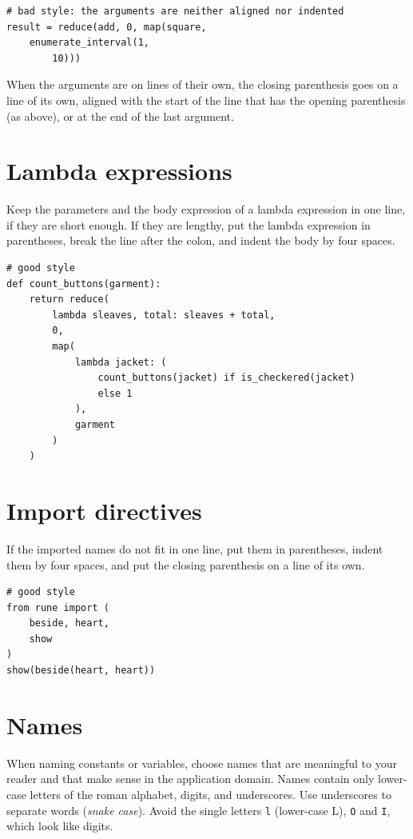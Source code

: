 \begin{lstlisting}
# bad style: the arguments are neither aligned nor indented
result = reduce(add, 0, map(square,
    enumerate_interval(1,
        10)))
\end{lstlisting}

When the arguments are on lines of their own, the closing parenthesis goes on a line of its own,
aligned with the start of the line that has the opening parenthesis (as above), or at the end of
the last argument.

\section*{Lambda expressions}

Keep the parameters and the body expression of a lambda expression in one line, if they are short
enough. If they are lengthy, put the lambda expression in parentheses, break the line after the
colon, and indent the body by four spaces.

\begin{lstlisting}
# good style
def count_buttons(garment):
    return reduce(
        lambda sleaves, total: sleaves + total,
        0,
        map(
            lambda jacket: (
                count_buttons(jacket) if is_checkered(jacket)
                else 1
            ),
            garment
        )
    )
\end{lstlisting}

\section*{Import directives}

If the imported names do not fit in one line, put them in parentheses, indent them by four
spaces, and put the closing parenthesis on a line of its own.

\begin{lstlisting}
# good style
from rune import (
    beside, heart,
    show
)
show(beside(heart, heart))
\end{lstlisting}

\section*{Names}

When naming constants or variables, choose names that are meaningful to your reader and that make
sense in the application domain. Names contain only lower-case letters of the roman alphabet,
digits, and underscores. Use underscores to separate words (\emph{snake case}). Avoid the
single letters \lstinline{l} (lower-case L), \lstinline{O} and \lstinline{I}, which look like digits.

